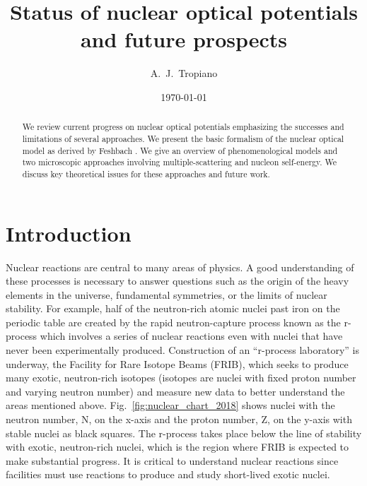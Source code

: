 \documentclass[preprintnumbers,floatfix,aps,prc,preprint,nofootinbib]{revtex4-1}
\begin{document}
\title{Status of nuclear optical potentials and future prospects}


\author{A.~J.~Tropiano}


\date{\today}

\begin{abstract}
We review current progress on nuclear optical potentials emphasizing the successes and limitations of several approaches. We present the basic formalism of the nuclear optical model as derived by Feshbach \cite{Feshbach:1958nx, Feshbach:1962ut}. We give an overview of phenomenological models and two microscopic approaches involving multiple-scattering and nucleon self-energy. We discuss key theoretical issues for these approaches and future work.
\end{abstract}

\maketitle

\newpage


\section{Introduction}
\label{sec:intro}


Nuclear reactions are central to many areas of physics. A good understanding of these processes is necessary to answer questions such as the origin of the heavy elements in the universe, fundamental symmetries, or the limits of nuclear stability. For example, half of the neutron-rich atomic nuclei past iron on the periodic table are created by the rapid neutron-capture process known as the r-process which involves a series of nuclear reactions even with nuclei that have never been experimentally produced. Construction of an ``r-process laboratory'' is underway, the Facility for Rare Isotope Beams (FRIB), which seeks to produce many exotic, neutron-rich isotopes (isotopes are nuclei with fixed proton number and varying neutron number) and measure new data to better understand the areas mentioned above. Fig.~\ref{fig:nuclear_chart_2018} shows nuclei with the neutron number, N, on the x-axis and the proton number, Z, on the y-axis with stable nuclei as black squares. The r-process takes place below the line of stability with exotic, neutron-rich nuclei, which is the region where FRIB is expected to make substantial progress. It is critical to understand nuclear reactions since facilities must use reactions to produce and study short-lived exotic nuclei.
\\
\end{document}
